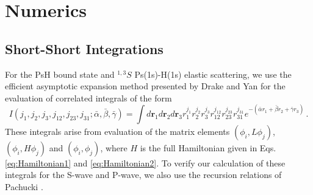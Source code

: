\documentclass[preprint,showpacs,preprintnumbers,amsmath,amssymb]{revtex4}
\newcommand{\todoi}{\todo[inline]}
\begin{document}
\section{Numerics}
\label{sec:Numerical}

\subsection{Short-Short Integrations}
\label{sec:ShortInt}
For the PsH bound state and $^{1,3}S$ Ps(1s)-H(1s) elastic scattering, we use the efficient asymptotic expansion method presented by Drake and Yan \cite{Drake1995} for the evaluation of correlated integrals of the form
\begin{equation}
\label{eq:ShortInt}
I(j_1,j_2,j_3,j_{12},j_{23},j_{31}; \bar{\alpha}, \bar{\beta}, \bar{\gamma}) =
\int
d \textbf{r}_1 d \textbf{r}_2 d \textbf{r}_3
r_1^{j_1} r_2^{j_2} r_3^{j_3} r_{12}^{j_{12}}
r_{23}^{j_{23}} r_{31}^{j_{31}}
e^{-(\bar{\alpha} r_1 + \bar{\beta} r_2 + \bar{\gamma} r_3)}\, .
\end{equation}
These integrals arise from evaluation of the matrix elements $(\phi_i, L \phi_j)$, $(\phi_i, H \phi_j)$ and $(\phi_i, \phi_j)$, where $H$ is the full Hamiltonian given in Eqs. \ref{eq:Hamiltonian1} and \ref{eq:Hamiltonian2}. To verify our calculation of these integrals for the S-wave and P-wave, we also use the recursion relations of Pachucki \cite{Pachucki2004}.
\end{document}
